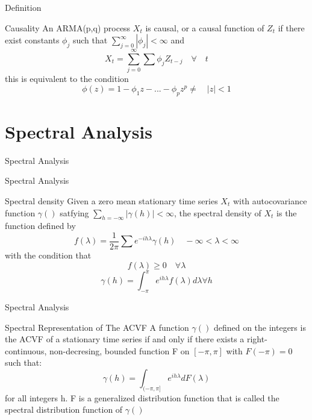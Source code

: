 \documentclass[11pt]{beamer}
\begin{document}
\begin{frame}{Definition \cite{brockwell2002introduction}}
\begin{alertblock}{Causality}
An ARMA(p,q) process ${X_{t}}$ is causal, or a causal function of ${Z_{t}}$ if there exist constants  ${\phi_{j}}$ such that $\sum_{j=0}^{\infty}|\phi_{j}|< \infty$ and
\begin{equation*}
X_{t}=\sum^{\infty}_{j=0}\sum\phi_{j}Z_{t-j}\quad\forall\quad t
\end{equation*}
this is equivalent to the condition 
\begin{equation*}
\phi(z)=1-\phi_{1}z-...-\phi_{p}z^{p}\neq \quad|z|<1
\end{equation*}
\end{alertblock}
\end{frame}

\section{Spectral Analysis}


\begin{frame}
\begin{center}
\Huge
Spectral Analysis
\end{center}
\end{frame}



\begin{frame}{Spectral Analysis \cite{brockwell2002introduction}}
\begin{alertblock}{Spectral density}
Given a zero mean stationary time series ${X_{t}}$ with autocovariance function $\gamma()$ satfying $\sum_{h=-\infty}|\gamma(h)|<\infty$, the spectral density of ${X_{t}}$ is the function defined by
\begin{equation*}
f(\lambda)=\dfrac{1}{2\pi}\sum e^{-ih\lambda}\gamma(h)\quad -\infty<\lambda<\infty
\end{equation*}
with the condition that 
\begin{equation*}
f(\lambda)\geq 0 \quad\forall \lambda
\end{equation*}
\begin{equation*}
\gamma(h)=\int^{\pi}_{-\pi}e^{ih\lambda}f(\lambda)d\lambda\forall h
\end{equation*}
\end{alertblock}
\end{frame}

\begin{frame}{Spectral Analysis \cite{brockwell2002introduction}}
\begin{alertblock}{Spectral Representation of The ACVF}
A function $\gamma()$ defined on the integers is the ACVF of a stationary time series if and only if there exists a right-continuous, non-decresing, bounded function F on $[-\pi,\pi]$ with $F(-\pi)=0$ such that:
\begin{equation*}
\gamma(h)=\int_{(-\pi,\pi]}e^{ih\lambda}dF(\lambda)
\end{equation*}
for all integers h. F is a generalized distribution function that is called the spectral distribution function of  $\gamma()$
\end{alertblock}
\end{frame}
\end{document}
